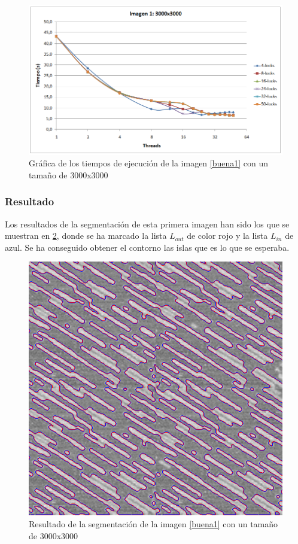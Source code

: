 \begin{figure}[H]
	\captionsetup{justification=centering}
	\centering
	\includegraphics[width=.9\textwidth]{./imagenes/graf1-3000}
	\caption{Gr\'{a}fica de los tiempos de ejecuci\'{o}n de la imagen \ref{buena1} con un tama\~{n}o de 3000x3000}	
	\label{graf1-3000}
\end{figure}

\subsubsection{Resultado}


Los resultados de la segmentaci\'{o}n de esta primera imagen han sido los que se muestran en \ref{result1}, donde se ha marcado la lista $L_{out}$ de color rojo y la lista $L_{in}$ de azul. Se ha conseguido obtener el contorno las islas que es lo que se esperaba.


\begin{figure}[H]
	\captionsetup{justification=centering}
	\centering
	\includegraphics[width=.7\textwidth]{./imagenes/result1}
	\caption{Resultado de la segmentaci\'{o}n de la imagen \ref{buena1} con un tama\~{n}o de 3000x3000}	
	\label{result1}
\end{figure}


